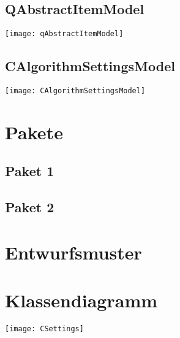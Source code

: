 \subsection{QAbstractItemModel}
\texttt{[image: qAbstractItemModel]}\\

\subsection{CAlgorithmSettingsModel}
\texttt{[image: CAlgorithmSettingsModel]}\\
\section{Pakete}
\subsection{Paket 1}
\subsection{Paket 2}
\section{Entwurfsmuster}

\section{Klassendiagramm}
\texttt{[image: CSettings]}\\

